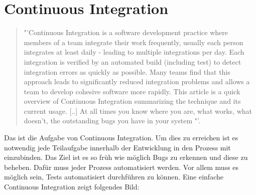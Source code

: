 \section{Continuous Integration}
\label{sec:ContinuousIntegration}
\begin{quote}
	"'Continuous Integration is a software development practice where members of a team integrate their work frequently, usually each person integrates at least daily - leading to multiple integrations per day. Each integration is verified by an automated build (including test) to detect integration errors as quickly as possible. Many teams find that this approach leads to significantly reduced integration problems and allows a team to develop cohesive software more rapidly. This article is a quick overview of Continuous Integration summarizing the technique and its current usage. [..] At all times you know where you are, what works, what doesn't, the outstanding bugs you have in your system "'\cite{Fowler:CI}. 
\end{quote}
Das ist die Aufgabe von Continuous Integration. Um dies zu erreichen ist es notwendig jede Teilaufgabe innerhalb der Entwicklung in den Prozess mit einzubinden. Das Ziel ist es so früh wie möglich Bugs zu erkennen und diese zu beheben. Dafür muss jeder Prozess automatisiert werden. Vor allem muss es möglich sein, Tests automatisiert durchführen zu können. Eine einfache Continuous Integration zeigt folgendes Bild:

